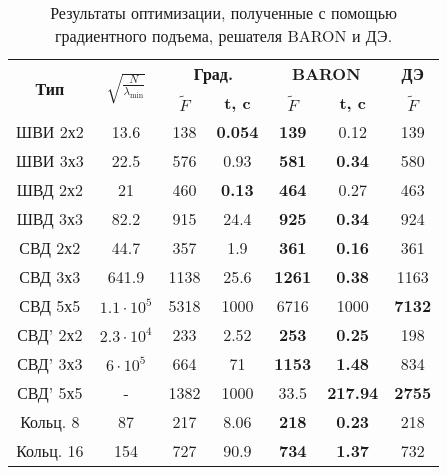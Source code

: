 \begin{table}[!h]
\centering
\caption{ Результаты оптимизации, полученные с помощью градиентного подъема, решателя BARON и ДЭ.}
\begin{tabular}{|c|c|c c|c c|c|}
    \hline
    \multirow{2}{*}{\textbf{Тип}} & \multirow{2}{*}{$\sqrt{\frac{N}{\lambda_{\min}}}$} & \multicolumn{2}{c}{\textbf{Град.}} & \multicolumn{2}{|c|}{\textbf{BARON}} & \textbf{ДЭ}\\
    & & \textbf{$\tilde{F}$} & \textbf{t, c} & \textbf{$\tilde{F}$} & \textbf{t, c} & \textbf{$\tilde{F}$} \\
    \hline
    ШВИ 2х2 & 13.6 & 138 & \textbf{0.054} & \textbf{139} & 0.12 & 139 \\
    ШВИ 3х3 & 22.5 & 576 & 0.93 & \textbf{581} & \textbf{0.34} & 580  \\
    ШВД 2х2 & 21 & 460 & \textbf{0.13} & \textbf{464} & 0.27 & 463  \\
    ШВД 3х3 & 82.2 & 915 & 24.4 & \textbf{925} & \textbf{0.34} & 924   \\
    СВД 2х2 & 44.7& 357 & 1.9 & \textbf{361} & \textbf{0.16} & 361  \\
    СВД 3х3 & 641.9& 1138 & 25.6 & \textbf{1261} & \textbf{0.38} & 1163 \\
    СВД 5х5 & $1.1\cdot10^{5}$ & 5318 & 1000 & 6716 & 1000 & \textbf{7132}  \\
    СВД' 2х2 & $2.3\cdot10^{4}$ & 233 & 2.52 & \textbf{253} & \textbf{0.25} & 198  \\
    СВД' 3х3 & $6\cdot10^5$& 664 & 71 & \textbf{1153} & \textbf{1.48} & 834  \\
    СВД' 5х5 & - & 1382 & 1000 & 33.5 & \textbf{217.94} & \textbf{2755}   \\
    Кольц. 8 & 87 & 217 & 8.06 & \textbf{218} & \textbf{0.23} & 218  \\
    Кольц. 16 & 154 & 727 & 90.9 & \textbf{734} & \textbf{1.37} & 732  \\
    \hline
\end{tabular}
\label{tab:results}
\end{table}

